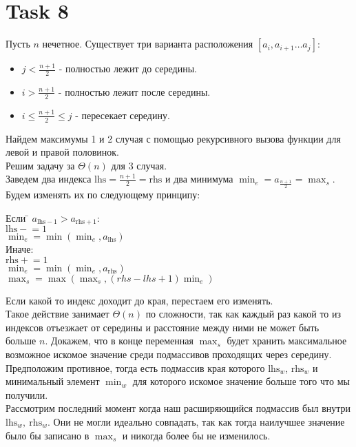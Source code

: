 \documentclass[12pt]{exam}
\newcommand{\pluseq}{\mathrel{+}=}
\newcommand{\minuseq}{\mathrel{-}=}
\begin{document}
\section*{Task 8}
Пусть $n$ нечетное. 
Существует три варианта расположения $[a_i, a_{i + 1} \ldots a_{j}]$:
\begin{itemize}
    \item $j < \frac{n + 1}{2}$ - полностью лежит до середины.
    \item $i > \frac{n + 1}{2}$ - полностью лежит после середины.
    \item $i \leq \frac{n + 1}{2} \leq j$ - пересекает середину.
\end{itemize}
Найдем максимумы 1 и 2 случая с помощью рекурсивного вызова функции для левой и правой половинок.\\
Решим задачу за $\Theta(n)$ для 3 случая. \\
Заведем два индекса $\mathrm{lhs} = \frac{n + 1}{2} = \mathrm{rhs}$ 
и два минимума $\min_e = a_{\frac{n + 1}{2}} = \max_s$.
Будем изменять их по следующему принципу:
\begin{tabbing}
    Если \= $a_{\mathrm{lhs} - 1} > a_{\mathrm{rhs} + 1}$: \\
    \> $\mathrm{lhs} \minuseq 1$\\
    \> $\min_e = \min(\min_e, a_{\mathrm{lhs}}) $\\
    Иначе:\\
    \> $\mathrm{rhs} \pluseq 1$\\
    \> $\min_e = \min(\min_e, a_{\mathrm{rhs}}) $\\
    
    $\max_s = \max(\max_s, (rhs - lhs + 1) \min_e)$
\end{tabbing}
Если какой то индекс доходит до края, перестаем его изменять. \\
Такое действие занимает $\Theta(n)$ по сложности, 
так как каждый раз какой то из индексов отъезжает от середины и расстояние между ними не может быть больше $n$.
Докажем, что в конце переменная $\max_s$ будет хранить максимальное возможное искомое значение среди подмассивов проходящих через середину.
Предположим противное, тогда есть подмассив края которого 
$\mathrm{lhs}_{w}$, $\mathrm{rhs}_w$ и минимальный элемент $\min_w$
для которого искомое значение больше того что мы получили. \\
Рассмотрим последний момент когда наш расширяющийся подмассив 
был внутри $\mathrm{lhs}_w, \: \mathrm{rhs}_w$. 
Они не могли идеально совпадать, так как тогда наилучшее значение было бы записано в $\max_s$ и никогда более бы не изменилось.\\
\end{document}
